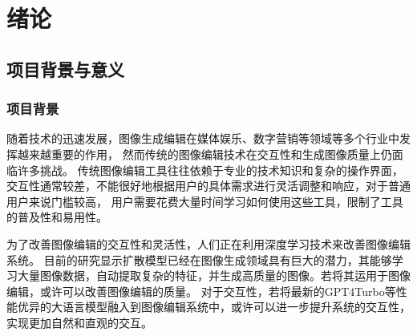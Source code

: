 \documentclass[a4paper,AutoFakeBold,oneside,12pt]{book}
\begin{document}

\blankmatter
  

\blankmatter
 

\blankmatter
  

\blankmatter
  




\frontmatter
\tableofcontents %

\newpage\mainmatter
{}



\chapter{绪论} %
\section{项目背景与意义}
\subsection{项目背景}
随着技术的迅速发展，图像生成编辑在媒体娱乐、数字营销等领域等多个行业中发挥越来越重要的作用，
然而传统的图像编辑技术在交互性和生成图像质量上仍面临许多挑战。
传统图像编辑工具往往依赖于专业的技术知识和复杂的操作界面，交互性通常较差，不能很好地根据用户的具体需求进行灵活调整和响应，对于普通用户来说门槛较高，
用户需要花费大量时间学习如何使用这些工具，限制了工具的普及性和易用性。

为了改善图像编辑的交互性和灵活性，人们正在利用深度学习技术来改善图像编辑系统。
目前的研究显示扩散模型已经在图像生成领域具有巨大的潜力，其能够学习大量图像数据，自动提取复杂的特征，并生成高质量的图像。若将其运用于图像编辑，或许可以改善图像编辑的质量。
对于交互性，若将最新的GPT4Turbo等性能优异的大语言模型融入到图像编辑系统中，或许可以进一步提升系统的交互性，实现更加自然和直观的交互。
\end{document}
